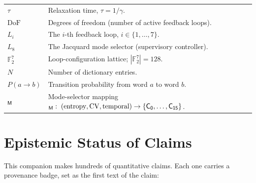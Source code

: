 \documentclass[11pt,letterpaper,openany]{book}
\theoremstyle{definition}
\theoremstyle{plain}
\newcommand{\CV}{\operatorname{CV}}
\newcommand{\Loop}[1]{L_{#1}}
\begin{document}
\begin{longtable}{@{}p{}p{}@{}}
$\tau$            & Relaxation time, $\tau = 1/\gamma$. \\
$\mathrm{DoF}$    & Degrees of freedom (number of active feedback loops). \\
$\Loop{i}$        & The $i$-th feedback loop, $i \in \{1,\dots,7\}$. \\
$\Loop{8}$        & The Jacquard mode selector (supervisory controller). \\
$\mathbb{F}_2^7$  & Loop-configuration lattice; $|\mathbb{F}_2^7|=128$. \\
$N$               & Number of dictionary entries. \\
$P(a\to b)$       & Transition probability from word $a$ to word $b$. \\
$\sf_M$           & Mode-selector mapping $\sf_M:\;(\text{entropy},\CV,\text{temporal}) \to \{C_0,\dots,C_{15}\}$. \\
\bottomrule
\end{longtable}

\clearpage

\chapter*{Epistemic Status of Claims}
\label{ch:epistemic}

This companion makes hundreds of quantitative claims. Each one carries a
provenance badge, set as the first text of the claim:
\end{document}
